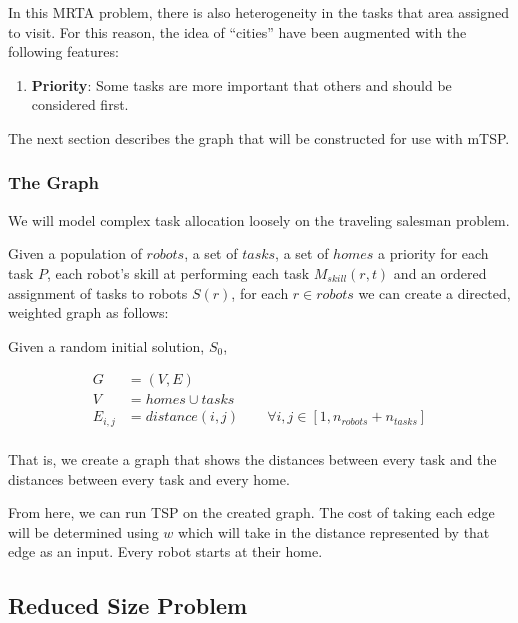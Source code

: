 \documentclass[a4paper]{article}
\begin{document}
In this MRTA problem, there is also heterogeneity in the tasks that area assigned to visit. For this reason, the idea of ``cities'' have been augmented with the following features:

\begin{enumerate}
\item \textbf{Priority}: Some tasks are more important that others and should be considered first.
\end{enumerate}

The next section describes the graph that will be constructed for use with mTSP.

\subsubsection{The Graph}
We will model complex task allocation loosely on the traveling salesman problem.

Given a population of $\mathit{robots}$, a set of $\mathit{tasks}$, a set of $\mathit{homes}$ a priority for each task $P$, each robot's skill at performing each task $M_{skill}(r,t)$ and an ordered assignment of tasks to robots $S(r)$, for each $r \in \mathit{robots}$
we can create a directed, weighted graph as follows:

Given a random initial solution, $S_0$,

\begin{align*}
	G &= (V, E) \\
	V &= \mathit{homes} \cup \mathit{tasks} \\
	E_{i, j} &= distance(i,j) \qquad \forall i,j \in [1, n_{robots}+n_{tasks}] \\
\end{align*}
%

That is, we create a graph that shows the distances between every task and the distances between every task and every home.

From here, we can run TSP on the created graph. The cost of taking each edge will be determined using $w$ which will take in the distance represented by that edge as an input. Every robot starts at their home.

\subsection{Reduced Size Problem}

\end{document}
